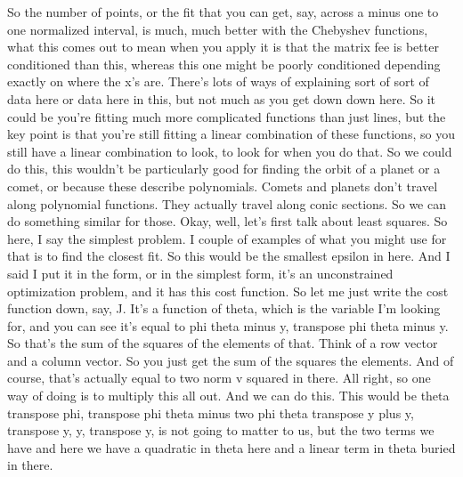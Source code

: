 \documentclass[11pt,a4paper]{article}
\begin{document}
So the number of points, or the fit that you can get, say, across a minus one to one normalized interval, is much, much better with the Chebyshev functions, what this comes out to mean when you apply it is that the matrix fee is better conditioned than this, whereas this one might be poorly conditioned depending exactly on where the x's are. There's lots of ways of explaining sort of sort of data here or data here in this, but not much as you get down down here. So it could be you're fitting much more complicated functions than just lines, but the key point is that you're still fitting a linear combination of these functions, so you still have a linear combination to look, to look for when you do that. So we could do this, this wouldn't be particularly good for finding the orbit of a planet or a comet, or because these describe polynomials. Comets and planets don't travel along polynomial functions. They actually travel along conic sections. So we can do something similar for those. Okay, well, let's first talk about least squares. So here, I say the simplest problem. I couple of examples of what you might use for that is to find the closest fit. So this would be the smallest epsilon in here. And I said I put it in the form, or in the simplest form, it's an unconstrained optimization problem, and it has this cost function. So let me just write the cost function down, say, J. It's a function of theta, which is the variable I'm looking for, and you can see it's equal to phi theta minus y, transpose phi theta minus y. So that's the sum of the squares of the elements of that. Think of a row vector and a column vector. So you just get the sum of the squares the elements. And of course, that's actually equal to two norm v squared in there. All right, so one way of doing is to multiply this all out. And we can do this. This would be theta transpose phi, transpose phi theta minus two phi theta transpose y plus y, transpose y, y, transpose y, is not going to matter to us, but the two terms we have and here we have a quadratic in theta here and a linear term in theta buried in there.
\end{document}
